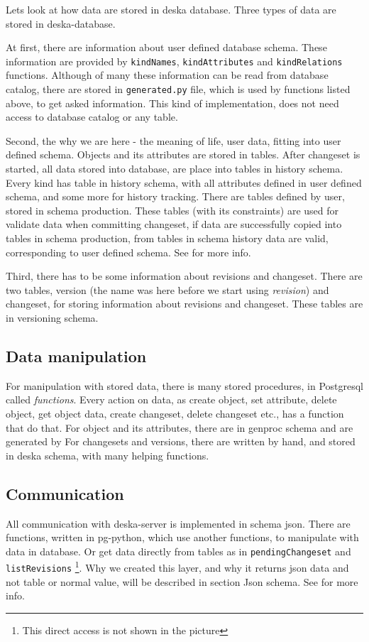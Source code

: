 \documentclass[deska]{subfiles}
\begin{document}
Lets look at how data are stored in deska database. Three types of data are stored in deska-database.

At first, there are information
about user defined database schema. These information are provided by {\tt kindNames}, {\tt kindAttributes} and {\tt kindRelations} functions.
Although of many these information can be read from database catalog, there are stored in {\tt generated.py} file, which is used by
functions listed above, to get asked information. This kind of implementation, does not need access to database catalog or any table.

Second, the why we are here - the meaning of life, user data, fitting into user defined schema.
Objects and its attributes are stored in tables. 
After changeset is started, all data stored into database, are place into tables in history schema. Every kind has table in history
schema, with all attributes defined in user defined schema, and some more for history tracking.
There are tables defined by user, stored in schema production. These tables
(with its constraints) are used for validate data when committing changeset, if data are successfully copied into tables in schema production,
from tables in schema history data are valid, corresponding to user defined schema.
See  for more info.

Third, there has to be some information about revisions and changeset. There are two tables, version (the name was here before
we start using {\em revision}) and changeset, for storing information about revisions and changeset. These tables are
in versioning schema.

\subsection{Data manipulation}
For manipulation with stored data, there is many stored procedures, in Postgresql called {\em functions}.
Every action on data, as create object, set attribute, delete object, get object data, create changeset, delete changeset etc.,
has a function that do that. For object and its attributes, there are in genproc schema and are generated by
For changesets and versions, there are written by hand, and stored in deska schema, with many helping functions.

\subsection{Communication}
All communication with deska-server is implemented in schema json. There are functions, written in pg-python, which use another
functions, to manipulate with data in database. Or get data directly from tables as in {\tt pendingChangeset} and {\tt listRevisions}
\footnote{This direct access is not shown in the picture}.
Why we created this layer, and why it returns json data and not table or normal value, will be described in section Json schema.
See  for more info.
\end{document}
